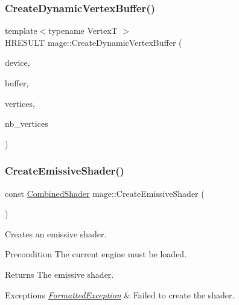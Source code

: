 \hypertarget{namespacemage_aeb9bab1a9d739e3908c90db3832d9053}{}\label{namespacemage_aeb9bab1a9d739e3908c90db3832d9053} 
\subsubsection{\texorpdfstring{Create\+Dynamic\+Vertex\+Buffer()}{CreateDynamicVertexBuffer()}}
{\footnotesize\ttfamily template$<$typename VertexT $>$ \\
H\+R\+E\+S\+U\+LT mage\+::\+Create\+Dynamic\+Vertex\+Buffer (\begin{DoxyParamCaption}\item[{I\+D3\+D11\+Device2 $\ast$}]{device,  }\item[{I\+D3\+D11\+Buffer $\ast$$\ast$}]{buffer,  }\item[{const VertexT $\ast$}]{vertices,  }\item[{size\+\_\+t}]{nb\+\_\+vertices }\end{DoxyParamCaption})}

\hypertarget{namespacemage_a51ba0b464a27857459aff0003939be92}{}\label{namespacemage_a51ba0b464a27857459aff0003939be92} 
\subsubsection{\texorpdfstring{Create\+Emissive\+Shader()}{CreateEmissiveShader()}}
{\footnotesize\ttfamily const \hyperlink{structmage_1_1_combined_shader}{Combined\+Shader} mage\+::\+Create\+Emissive\+Shader (\begin{DoxyParamCaption}{ }\end{DoxyParamCaption})}

Creates an emissive shader.

\begin{DoxyPrecond}{Precondition}
The current engine must be loaded. 
\end{DoxyPrecond}
\begin{DoxyReturn}{Returns}
The emissive shader. 
\end{DoxyReturn}

\begin{DoxyExceptions}{Exceptions}
{\em \hyperlink{structmage_1_1_formatted_exception}{Formatted\+Exception}} & Failed to create the shader. \\
\hline
\end{DoxyExceptions}
\hypertarget{namespacemage_ac93dae3a8755fa1e1c9be6c8aa0e07d2}{}\label{namespacemage_ac93dae3a8755fa1e1c9be6c8aa0e07d2} 
